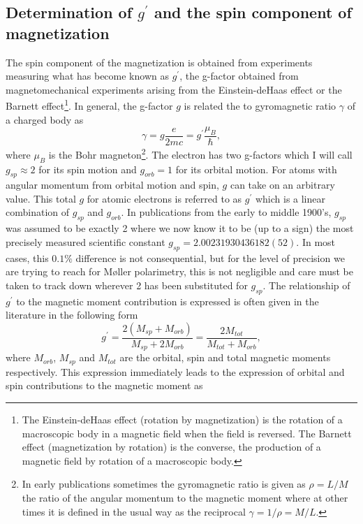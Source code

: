 \documentclass[12pt]{article}
\begin{document}
\subsection{Determination of $g^{\prime}$ and the spin component of magnetization}
The spin component of the magnetization is obtained from experiments measuring what has become known as $g^{\prime}$, the g-factor obtained from magnetomechanical experiments arising from the Einstein-deHaas effect or the Barnett effect\footnote{The Einstein-deHaas effect (rotation by magnetization) is the rotation of a macroscopic body in a magnetic field when the field is reversed. The Barnett effect (magnetization by rotation) is the converse, the production of a magnetic field by rotation of a macroscopic body.}. In general, the g-factor $g$ is related the to gyromagnetic ratio $\gamma$ of a charged body as 
\begin{equation}
\gamma=g\frac{e}{2mc}=g^{\prime}\frac{\mu_B}{\hbar},
\label{eq:gyro}
\end{equation}
where $\mu_B$ is the Bohr magneton\footnote{In early publications sometimes the gyromagnetic ratio is given as $\rho=L/M$ the ratio of the angular momentum to the magnetic moment where at other times it is defined in the usual way as the reciprocal $\gamma=1/\rho=M/L$.}. The electron has two g-factors which I will call $g_{sp}\approx2$ for its spin motion and $g_{orb}=1$ for its orbital motion. For atoms with angular momentum from orbital motion and spin, $g$ can take on an arbitrary value. This total $g$ for atomic electrons is referred to as $g^{\prime}$ which is a linear combination of $g_{sp}$ and $g_{orb}$.
In publications from the early to middle 1900's, $g_{sp}$ was assumed to be exactly 2 where we now know it to be (up to a sign) the most precisely measured scientific constant $g_{sp}=2.00231930436182(52)$. In most cases, this $0.1\%$ difference is not consequential, but for the level of precision we are trying to reach for M\o ller polarimetry, this is not negligible and care must be taken to track down wherever 2 has been substituted for $g_{sp}$. The relationship of $g^{\prime}$ to the magnetic moment contribution is expressed is often given in the literature in the following form \cite{Meyer1961, Smit1959}
\begin{equation}
g^{\prime}=\frac{2(M_{sp}+M_{orb})}{M_{sp}+2M_{orb}}=\frac{2M_{tot}}{M_{tot}+M_{orb}},
\label{eq:gprime_approx}
\end{equation}
where $M_{orb}$, $M_{sp}$ and  $M_{tot}$ are the orbital, spin and total magnetic moments respectively. This expression immediately leads to the expression of orbital and spin contributions to the magnetic moment as \cite{deBever1997}
\end{document}
